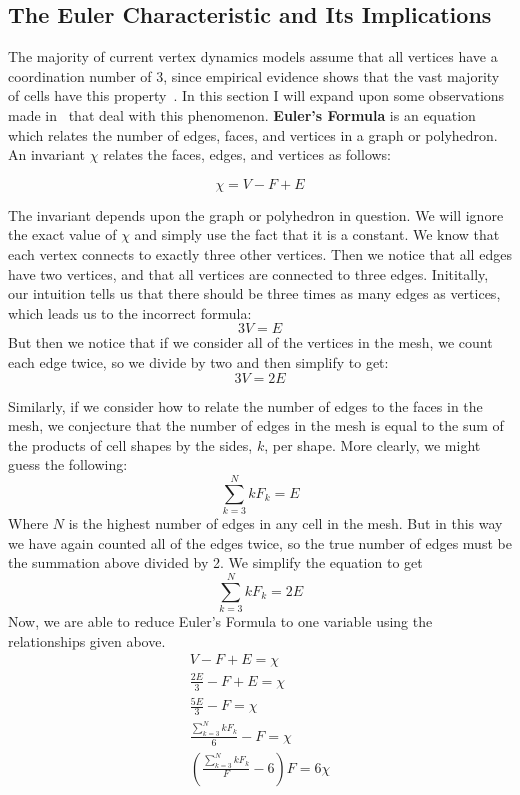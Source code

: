 \subsection{The Euler Characteristic and Its Implications}
The majority of current vertex dynamics models assume that all vertices have a coordination number of 3, since empirical evidence shows that the vast majority of cells have this property~\cite{EpithelialTopology,Overview}. In this section I will expand upon some observations made in~\cite{Soap} that deal with this phenomenon. \textbf{Euler's Formula} is an equation which relates the number of edges, faces, and vertices in a graph or polyhedron. An invariant $\chi$ relates the faces, edges, and vertices as follows:

\begin{equation}
\chi = V - F + E
\end{equation}

The invariant depends upon the graph or polyhedron in question. We will ignore the exact value of $\chi$ and simply use the fact that it is a constant. We know that each vertex connects to exactly three other vertices. Then we notice that all edges have two vertices, and that all vertices are connected to three edges. Inititally, our intuition tells us that there should be three times as many edges as vertices, which leads us to the incorrect formula:
\begin{equation}
3V = E
\end{equation}
But then we notice that if we consider all of the vertices in the mesh, we count each edge twice, so we divide by two and then simplify to get:
\begin{equation}
3V = 2E
\end{equation}

Similarly, if we consider how to relate the number of edges to the faces in the mesh, we conjecture that the number of edges in the mesh is equal to the sum of the products of cell shapes by the sides, $k$,  per shape. More clearly, we might guess the following:
\begin{equation}
\sum_{k=3}^N kF_k = E
\end{equation}
Where $N$ is the highest number of edges in any cell in the mesh. But in this way we have again counted all of the edges twice, so the true number of edges must be the summation above divided by 2. We simplify the equation to get
\begin{equation}
\sum_{k=3}^N kF_k = 2E
\end{equation}
Now, we are able to reduce Euler's Formula to one variable using the relationships given above.
\begin{gather}
V - F + E = \chi\\
\frac{2E}3 - F + E = \chi\\
\frac{5E}3 - F = \chi\\
\frac{\sum_{k=3}^N kF_k}{6} - F = \chi\\
(\frac{\sum_{k=3}^N kF_k}{F} - 6)F = 6\chi
\end{gather}

